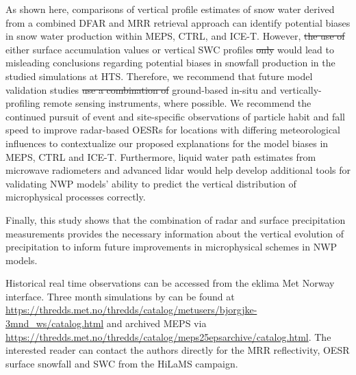 \documentclass{ametsocV5}
\providecommand{\DIFadd}[1]{{\protect\color{blue}\uwave{#1}}} %
\providecommand{\DIFdel}[1]{{\protect\color{red}\sout{#1}}}                      %
\providecommand{\DIFaddbegin}{} %
\providecommand{\DIFaddend}{} %
\providecommand{\DIFdelbegin}{} %
\providecommand{\DIFdelend}{} %
\newcommand{\DIFscaledelfig}{0.5}
\newlength{\DIFdelgraphicswidth} %
\newlength{\DIFdelgraphicsheight} %
\newcommand{\DIFaddincludegraphics}[2][]{{\color{blue}\fbox{\DIFOincludegraphics[#1]{#2}}}} %
\newcommand{\DIFdelincludegraphics}[2][]{%
\sbox{\DIFdelgraphicsbox}{\DIFOincludegraphics[#1]{#2}}%
\settoboxwidth{\DIFdelgraphicswidth}{\DIFdelgraphicsbox} %
\settoboxtotalheight{\DIFdelgraphicsheight}{\DIFdelgraphicsbox} %
\scalebox{\DIFscaledelfig}{%
\parbox[b]{\DIFdelgraphicswidth}{\usebox{\DIFdelgraphicsbox}\\[-\baselineskip] \rule{\DIFdelgraphicswidth}{0em}}\llap{\resizebox{\DIFdelgraphicswidth}{\DIFdelgraphicsheight}{%
\setlength{\unitlength}{\DIFdelgraphicswidth}%
\begin{picture}(1,1)%
\thicklines\linethickness{2pt} %
{\color[rgb]{1,0,0}\put(0,0){\framebox(1,1){}}}%
{\color[rgb]{1,0,0}\put(0,0){\line( 1,1){1}}}%
{\color[rgb]{1,0,0}\put(0,1){\line(1,-1){1}}}%
\end{picture}%
}\hspace*{3pt}}} %
} %
\DeclareRobustCommand{\DIFaddbegin}{\DIFOaddbegin \let\includegraphics\DIFaddincludegraphics} %
\DeclareRobustCommand{\DIFaddend}{\DIFOaddend \let\includegraphics\DIFOincludegraphics} %
\DeclareRobustCommand{\DIFdelbegin}{\DIFOdelbegin \let\includegraphics\DIFdelincludegraphics} %
\DeclareRobustCommand{\DIFdelend}{\DIFOaddend \let\includegraphics\DIFOincludegraphics} %
\begin{document}
	As shown here, comparisons of vertical profile estimates of snow water derived from a combined DFAR and MRR retrieval approach can identify potential biases in snow water production within MEPS, CTRL, and ICE-T. However, \DIFdelbegin \DIFdel{the use of }\DIFdelend \DIFaddbegin \DIFadd{using }\DIFaddend either surface accumulation values or vertical SWC profiles \DIFdelbegin \DIFdel{only }\DIFdelend would lead to misleading conclusions regarding potential biases in snowfall production in the studied simulations at HTS. Therefore, we recommend that future model validation studies \DIFdelbegin \DIFdel{use a combination of }\DIFdelend \DIFaddbegin \DIFadd{combine }\DIFaddend ground-based in-situ and vertically-profiling remote sensing instruments, where possible. We recommend the continued pursuit of event and site-specific observations of particle habit and fall speed to improve radar-based OESRs for locations with differing meteorological influences to contextualize our proposed explanations for the model biases in MEPS, CTRL and ICE-T. Furthermore, liquid water path estimates from microwave radiometers and advanced lidar would help develop additional tools for validating NWP models' ability to predict the vertical distribution of microphysical processes correctly. 

	Finally, this study shows that the combination of radar and surface precipitation measurements provides the necessary information about the vertical evolution of precipitation to inform future improvements in microphysical schemes in NWP models. 



%
\datastatement
Historical real time observations can be accessed from the eklima Met Norway interface.
Three month simulations by \citet{engdahl_effects_2020} can be found at \url{https://thredds.met.no/thredds/catalog/metusers/bjorgjke-3mnd_ws/catalog.html} and archived MEPS via \url{https://thredds.met.no/thredds/catalog/meps25epsarchive/catalog.html}. The interested reader can contact the authors directly for the MRR reflectivity, OESR surface snowfall and SWC from the HiLaMS campaign. 
\end{document}
